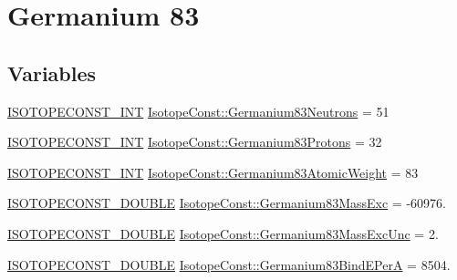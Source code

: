 \hypertarget{group___isotope_const-_germanium-_ge83}{}\section{Germanium 83}
\label{group___isotope_const-_germanium-_ge83}
\subsection*{Variables}
\begin{DoxyCompactItemize}
\item 
\mbox{\hyperlink{group___isotope_const-_macros_ga5f18360b3e99483a35c32d789e62621c}{I\+S\+O\+T\+O\+P\+E\+C\+O\+N\+S\+T\+\_\+\+I\+NT}} \mbox{\hyperlink{group___isotope_const-_germanium-_ge83_gaad6af1c2f9f5f698f12cdecfdbf089e2}{Isotope\+Const\+::\+Germanium83\+Neutrons}} = 51
\item 
\mbox{\hyperlink{group___isotope_const-_macros_ga5f18360b3e99483a35c32d789e62621c}{I\+S\+O\+T\+O\+P\+E\+C\+O\+N\+S\+T\+\_\+\+I\+NT}} \mbox{\hyperlink{group___isotope_const-_germanium-_ge83_gab6e629cea42b5d41be9fb61a7221b7bb}{Isotope\+Const\+::\+Germanium83\+Protons}} = 32
\item 
\mbox{\hyperlink{group___isotope_const-_macros_ga5f18360b3e99483a35c32d789e62621c}{I\+S\+O\+T\+O\+P\+E\+C\+O\+N\+S\+T\+\_\+\+I\+NT}} \mbox{\hyperlink{group___isotope_const-_germanium-_ge83_ga18cbcdfb5d97fdc12ffc96e63f4b6179}{Isotope\+Const\+::\+Germanium83\+Atomic\+Weight}} = 83
\item 
\mbox{\hyperlink{group___isotope_const-_macros_ga8f45a7272ce02c0b4c65c44636ed719a}{I\+S\+O\+T\+O\+P\+E\+C\+O\+N\+S\+T\+\_\+\+D\+O\+U\+B\+LE}} \mbox{\hyperlink{group___isotope_const-_germanium-_ge83_gabb4aabd3c51891ddd80b64aa7b43f6e7}{Isotope\+Const\+::\+Germanium83\+Mass\+Exc}} = -\/60976.
\item 
\mbox{\hyperlink{group___isotope_const-_macros_ga8f45a7272ce02c0b4c65c44636ed719a}{I\+S\+O\+T\+O\+P\+E\+C\+O\+N\+S\+T\+\_\+\+D\+O\+U\+B\+LE}} \mbox{\hyperlink{group___isotope_const-_germanium-_ge83_ga3115e5ef9f033fcda4b227c0523c2e17}{Isotope\+Const\+::\+Germanium83\+Mass\+Exc\+Unc}} = 2.
\item 
\mbox{\hyperlink{group___isotope_const-_macros_ga8f45a7272ce02c0b4c65c44636ed719a}{I\+S\+O\+T\+O\+P\+E\+C\+O\+N\+S\+T\+\_\+\+D\+O\+U\+B\+LE}} \mbox{\hyperlink{group___isotope_const-_germanium-_ge83_ga1083e8cd780e976fa48b7a8b30fcbf6c}{Isotope\+Const\+::\+Germanium83\+Bind\+E\+PerA}} = 8504.
\item 

\end{DoxyCompactItemize}
